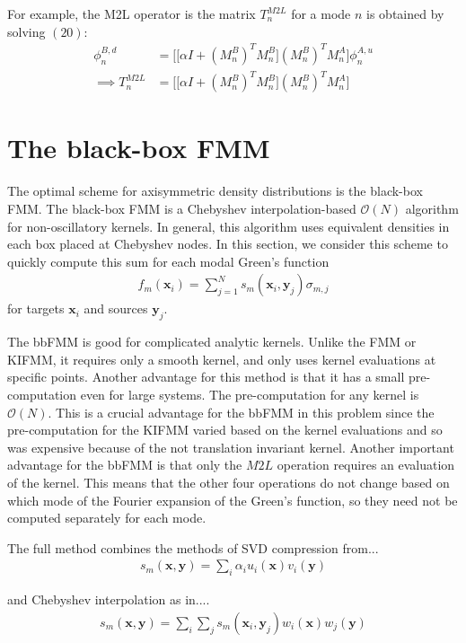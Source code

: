 \documentclass[11pt, oneside]{article}   	%
\begin{document}
For example, the M2L operator is the matrix $T^{M2L}_n$ for a mode $n$ is obtained by solving $(20)$:
\begin{align}
\phi^{B,d}_n&=\bigg[\big[\alpha I +(M_n^B)^TM_n^B\big](M_n^B)^TM_n^A\bigg]\phi^{A,u}_n\\
\implies T^{M2L}_n &= \bigg[\big[\alpha I +(M_n^B)^TM_n^B\big](M_n^B)^TM_n^A\bigg]
\end{align}

\section{The black-box FMM}
The optimal scheme for axisymmetric density distributions is the black-box FMM. The black-box FMM is a Chebyshev interpolation-based $\mathcal{O}(N)$ algorithm for non-oscillatory kernels. In general, this algorithm uses equivalent densities in each box placed at Chebyshev nodes. In this section, we consider this scheme to quickly compute this sum for each modal Green's function
\begin{align}
f_m(\mathbf{x}_i)=\sum_{j=1}^N s_m(\mathbf{x}_i,\mathbf{y}_j)\sigma_{m,j}
\end{align}
for targets $\mathbf{x}_i$ and sources $\mathbf{y}_j$.

The bbFMM is good for complicated analytic kernels. Unlike the FMM or KIFMM, it requires only a smooth kernel, and only uses kernel evaluations at specific points. Another advantage for this method is that it has a small pre-computation even for large systems. The pre-computation for any kernel is $\mathcal{O}(N)$. This is a crucial advantage for the bbFMM in this problem since the pre-computation for the KIFMM varied based on the kernel evaluations and so was expensive because of the not translation invariant kernel. Another important advantage for the bbFMM is that only the $M2L$ operation requires an evaluation of the kernel. This means that the other four operations do not change based on which mode of the Fourier expansion of the Green's function, so they need not be computed separately for each mode.

The full method combines the methods of SVD compression from...
\begin{align}
s_m(\mathbf{x},\mathbf{y})=\sum_i \alpha_i u_i(\mathbf{x})v_i(\mathbf{y})
\end{align}

and Chebyshev interpolation as in....
\begin{align}
s_m(\mathbf{x},\mathbf{y})=\sum_i\sum_j s_m(\mathbf{x}_i,\mathbf{y}_j)w_i(\mathbf{x})w_j(\mathbf{y})
\end{align}
\end{document}

